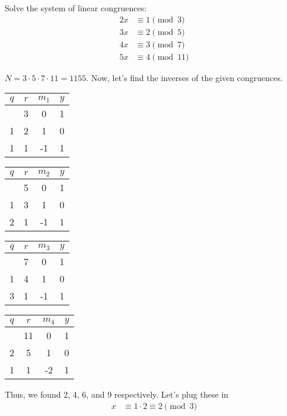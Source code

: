 \documentclass{article}
\begin{document}
\begin{problem}{}{}
    Solve the system of linear congruences:
    \begin{align*}
        2x &\equiv 1 \pmod{3} \\
        3x &\equiv 2 \pmod{5} \\
        4x &\equiv 3 \pmod{7} \\
        5x &\equiv 4 \pmod{11}
    \end{align*}
\end{problem}
\begin{solution}{}{}
    $N=3\cdot5\cdot7\cdot11=1155$. Now, let's find the inverses of the given congruences. 
    \begin{center}
        \begin{tabular}{c c c c}
            $q$ & $r$ & $m_1$ & $y$ \\
            \hline
            & 3 & 0 & 1 \\
            1 & 2 & 1 & 0 \\
            1 & 1 & -1 & 1
        \end{tabular}
        \quad
        \begin{tabular}{c c c c}
            $q$ & $r$ & $m_2$ & $y$ \\
            \hline
            & 5 & 0 & 1 \\
            1 & 3 & 1 & 0 \\
            2 & 1 & -1 & 1 \\
        \end{tabular}
        \quad
        \begin{tabular}{c c c c}
            $q$ & $r$ & $m_3$ & $y$ \\
            \hline
            & 7 & 0 & 1 \\
            1 & 4 & 1 & 0 \\
            3 & 1 & -1 & 1
        \end{tabular}
        \quad
        \begin{tabular}{c c c c}
            $q$ & $r$ & $m_4$ & $y$ \\
            \hline
            & 11 & 0 & 1 \\
            2 & 5 & 1 & 0 \\
            1 & 1 & -2 & 1
        \end{tabular}
        \end{center}
    Thus, we found 2, 4, 6, and 9 respectively. Let's plug these in
    \begin{align*}
        x &\equiv 1\cdot2 \equiv 2 \pmod{3} \\

\end{align*}
\end{solution}
\end{document}
